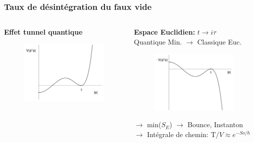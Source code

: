 \documentclass[handout]{beamer}
\newcommand{\Tau}{\mathrm{T}}
\begin{document}
\begin{frame}\frametitle{Taux de désintégration du faux vide}
\begin{columns}[T]
    \begin{column}[T]{.55\linewidth}
   \textbf{Effet tunnel quantique}
        \begin{figure}[.45\linewidth]
    \includegraphics[scale=0.2]{false1.png}
    \end{figure}
 
    \end{column}
    \begin{column}[T]{.45\linewidth}
   \textbf{Espace Euclidien:} $t\rightarrow i\tau$ \\
    Quantique Min. $\rightarrow$ Classique Euc.
       \begin{figure}
    \includegraphics[scale=0.15]{false2.png}
    \end{figure}
 $\rightarrow$ min($S_E$) $\rightarrow$ Bounce, Instanton
 \\$\rightarrow$ Intégrale de chemin: $ \Tau/V \approx e^{-So/\hbar}$    
    \end{column}
\end{columns}
\end{frame}
\end{document}
